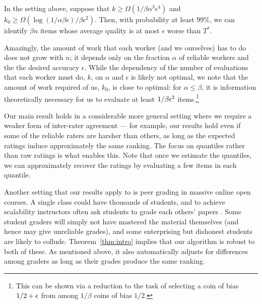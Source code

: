

\begin{theorem}
\label{thm:intro}
In the setting above, suppose that
$k \geq \Omega(1/\beta\alpha^3\epsilon^4)$ and 
$k_0 \geq \Omega(\log(1/\alpha\beta\epsilon)/\beta\epsilon^2)$. Then, with probability 
at least $99\%$, we can identify $\beta n$ items whose average quality is at most 
$\epsilon$ worse than $T^*$.
\end{theorem}
Amazingly, the amount of work that each worker (and we ourselves) has 
to do does not grow with $n$; it depends only on the fraction $\alpha$ of 
reliable workers and the the desired accuracy $\epsilon$.   While the dependency of the number of evaluations that each worker must do,  $k$, on $\alpha$ and $\epsilon$ is likely not optimal, we note that the amount of work required of us, $k_0$, is close to optimal: for $\alpha \le \beta$, it is information theoretically necessary for us to evaluate at least $1/\beta\eps^2$ items.\footnote{This can be shown via a reduction to the task of selecting a coin of bias $1/2+\eps$ from among $1/\beta$ coins of bias $1/2$. \iffalse To see this, consider the setting where $\alpha = \beta$ and imagine that the items are partitioned into $1/\beta$ sets; suppose the workers are also partitioned into $1/\beta$ sets with the reliable workers consisting of one such set.  Suppose the $i$th set of workers behaves as if the $i$th set of items have quality $1/2+\eps$, and the rest of the items have quality $1/2$.  By the symmetry of the setting, the ratings give no information into which set of items actually have quality $1/2+\eps$, hence we must determine this via our own evaluations, which is analogous to the task of selecting the coin of bias $1/2+\eps$ from among $1/\beta$ coins of bias $1/2$, which requires $1/\beta \eps^2$ flips, in expectation.\fi }

Our main result holds in a considerable more general setting where we require a weaker form of inter-rater agreement --- for example, our results hold even if some of the reliable raters are harsher than others, as long as 
the expected ratings induce approximately the same ranking.
The focus on quantiles rather than raw ratings is what enables this. 
Note that once we estimate the quantiles, we can approximately recover the 
ratings by evaluating a few items in each quantile.

Another setting that our results apply to is peer grading in massive online open courses. 
A single class could have thousands of students, 
and to achieve scalability instructors often ask students to grade each others' 
papers \citep{kulkarni2015peer,piech2013tuned}. 
Some student graders will simply not have mastered the material themselves (and hence may give unreliable grades), 
and some enterprising but dishonest students are likely to collude. Theorem~\ref{thm:intro} 
implies that our algorithm is robust to both of these. 
As mentioned above, it also automatically adjusts for differences among graders 
as long as their grades produce the same ranking.

